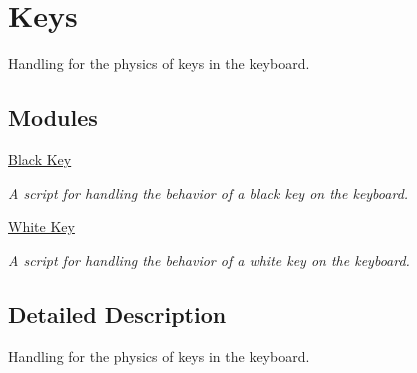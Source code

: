 \hypertarget{group___doc_keys}{}\section{Keys}
\label{group___doc_keys}


Handling for the physics of keys in the keyboard.  


\subsection*{Modules}
\begin{DoxyCompactItemize}
\item 
\hyperlink{group___doc_black_key}{Black Key}
\begin{DoxyCompactList}\small\item\em A script for handling the behavior of a black key on the keyboard. \end{DoxyCompactList}\item 
\hyperlink{group___doc_white_key}{White Key}
\begin{DoxyCompactList}\small\item\em A script for handling the behavior of a white key on the keyboard. \end{DoxyCompactList}\end{DoxyCompactItemize}


\subsection{Detailed Description}
Handling for the physics of keys in the keyboard. 

